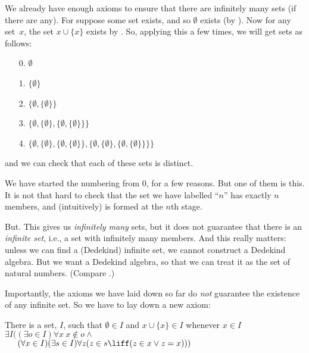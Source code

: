 \documentclass[../../../include/open-logic-section]{subfiles}
\begin{document}

We already have enough axioms to ensure that there are infinitely many
sets (if there are any). For suppose some set exists, and so
$\emptyset$ exists (by ). Now for
any set~$x$, the set $x \cup \{x\}$ exists by
. So, applying this a few
times, we will get sets as follows:
\begin{enumerate}
	\item[0.] $\emptyset$ %
	\item[1.] $ \{\emptyset\}$ %
	\item[2.] $\{\emptyset, \{\emptyset\}\}$ %
	\item[3.] $\{\emptyset, \{\emptyset\}, \{\emptyset, \{\emptyset\}\}\}$ %
	\item[4.] $\{\emptyset, \{\emptyset\}, \{\emptyset, \{\emptyset\}\}, \{\emptyset, \{\emptyset\}, \{\emptyset, \{\emptyset\}\}\}\}$%
\end{enumerate}
and we can check that each of these sets is distinct. 

We have started the numbering from $0$, for a few reasons. But one of
them is this. It is not that hard to check that the set we have
labelled ``$n$'' has exactly $n$ members, and (intuitively) is formed
at the $n$th stage. 

But. This gives us \emph{infinitely many} sets, but it does not
guarantee that there is an \emph{infinite set}, i.e., a set with
infinitely many members. And this really matters: unless we can find a
(Dedekind) infinite set, we cannot construct a Dedekind algebra. But
we want a Dedekind algebra, so that we can treat it as the set of
natural numbers. (Compare
.)

Importantly, the axioms we have laid down so far do \emph{not}
guarantee the existence of any infinite set. So we have to lay down a
new axiom:

\begin{axiom}[Infinity]
There is a set, $I$, such that $\emptyset \in I$ and $x \cup \{x\} \in I$ whenever $x \in I$\\
	$\exists I((\exists o \in I)\forall x\ x \notin o \land {}$\\
	$\phantom{\exists I(}(\forall x \in I)(\exists s \in I)\forall z(z \in s \liff (z \in x \lor z = x)))$
\end{axiom}
\end{document}

